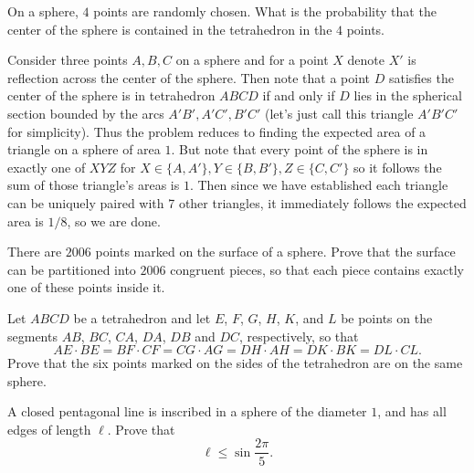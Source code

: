 \documentclass[12pt,a4paper]{memoir}
\theoremstyle{definition}
\begin{document}
\begin{question}[name={1992 Putnam}]
	On a sphere, $4$ points are randomly chosen. What is the probability that the center of the sphere is contained in the tetrahedron in the $4$ points.
\end{question}

\begin{solution}[name={Solution by Dinoboy}]
	Consider three points $A,B,C$ on a sphere and for a point $X$ denote $X'$ is reflection across the center of the sphere. Then note that a point $D$ satisfies the center of the sphere is in tetrahedron $ABCD$ if and only if $D$ lies in the spherical section bounded by the arcs $A'B', A'C', B'C'$ (let's just call this triangle $A'B'C'$ for simplicity). Thus the problem reduces to finding the expected area of a triangle on a sphere of area $1$. But note that every point of the sphere is in exactly one of $XYZ$ for $X \in \{A,A'\}, Y \in \{B,B'\}, Z \in \{C,C'\}$ so it follows the sum of those triangle's areas is $1$. Then since we have established each triangle can be uniquely paired with 7 other triangles, it immediately follows the expected area is $1/8$, so we are done.
\end{solution}



\begin{question}[name={2006 Baltic Way}]
	There are $2006$ points marked on the surface of a sphere. Prove that the surface can be partitioned into $2006$ congruent pieces, so that each piece contains exactly one of these points inside it.
\end{question}


\begin{question}[name={2016 Brazil Cono Sur Training}]
	Let $ABCD$ be a tetrahedron and let $E$, $F$, $G$, $H$, $K$, and $L$ be points on the segments $AB$, $BC$, $CA$, $DA$, $DB$ and $DC$, respectively, so that $$AE \cdot BE = BF\cdot  CF = CG \cdot  AG = DH \cdot  AH = DK \cdot  BK = DL \cdot  CL.$$ Prove that the six points marked on the sides of the tetrahedron are on the same sphere.
\end{question}


\begin{question}[name={2000 Belarus TST}]
	A closed pentagonal line is inscribed in a sphere of the diameter $1$, and has all edges of length $\ell$.
	Prove that $$\ell \le  \sin \frac{2\pi}{5}.$$
\end{question}
\end{document}
